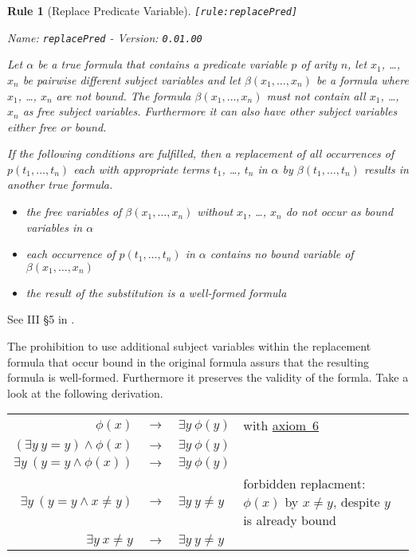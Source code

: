 \documentclass[a4paper,german,10pt,twoside]{book}
\newtheorem{rul}{Rule}
\theoremstyle{definition}
\theoremstyle{remark}
\begin{document}
\begin{rul}[Replace Predicate Variable]
\label{rule:replacePred} \hypertarget{rule:replacePred}{}
{\tt \tiny [\verb]rule:replacePred]]}

\par
{\em   Name: \verb]replacePred]  -  Version: \verb]0.01.00]}


Let $\alpha$ be a true formula that contains a predicate variable $p$ of arity $n$, let $x_1$, \ldots, $x_n$ be pairwise different subject variables and let $\beta(x_1, \ldots, x_n)$ be a formula where $x_1$, \ldots, $x_n$ are not bound. The formula $\beta(x_1, \ldots, x_n)$ must not contain all $x_1$, \ldots, $x_n$ as free subject variables. Furthermore it can also have other subject variables either free or bound.

If the following conditions are fulfilled, then a replacement of all occurrences of $p(t_1, \ldots, t_n)$ each with appropriate terms $t_1$, \ldots, $t_n$ in $\alpha$ by $\beta(t_1, \ldots, t_n)$ results in another true formula.

\begin{itemize}

\item
the free variables of $\beta(x_1, \ldots, x_n)$ without $x_1$, \ldots, $x_n$ do not occur as bound variables in $\alpha$ 

\item 
each occurrence of $p(t_1, \ldots, t_n)$ in $\alpha$ contains no bound variable of $\beta(x_1, \ldots, x_n)$ 

\item
the result of the substitution is a well-formed formula

\end{itemize}
\end{rul}

See III \S 5 in \cite{hilback}.

\par
The prohibition to use additional subject variables within the replacement formula that occur bound in the original formula assurs that the resulting formula is well-formed. Furthermore it preserves the validity of the formla. Take a look at the following derivation.

\par
\begin{tabularx}{\linewidth}{rclX}
  $ \phi(x)$                             & $\rightarrow$ & $\exists y \ \phi(y)$  
    & with \hyperlink{axiom:existencialGeneralization}{axiom~6} \\
  $ (\exists y \ y = y) \land \phi(x)$   & $\rightarrow$ & $\exists y \ \phi(y)$  
    &  \\
  $ \exists y \ (y = y \land \phi(x))$   & $\rightarrow$ & $\exists y \ \phi(y)$  
    &  \\
  $ \exists y \ (y = y \land x \neq y)$  & $\rightarrow$ & $\exists y \ y \neq y$  
    & forbidden replacment: $\phi(x)$ by $x \neq y$, despite $y$ is already bound \\
  $ \exists y \  x \neq y$  & $\rightarrow$ & $\exists y \ y \neq y$  
    &
\end{tabularx}
\end{document}
